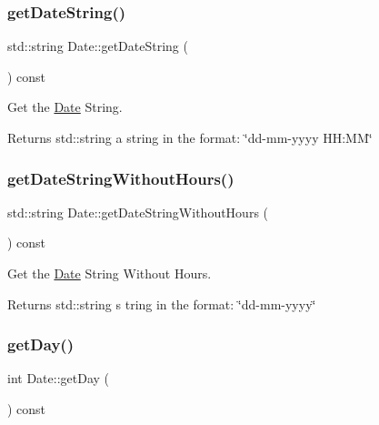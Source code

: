 \subsubsection{\texorpdfstring{get\+Date\+String()}{getDateString()}}
{\footnotesize\ttfamily std\+::string Date\+::get\+Date\+String (\begin{DoxyParamCaption}{ }\end{DoxyParamCaption}) const}



Get the \mbox{\hyperlink{classDate}{Date}} String. 

\begin{DoxyReturn}{Returns}
std\+::string a string in the format\+: \char`\"{}dd-\/mm-\/yyyy H\+H\+:\+M\+M\char`\"{} 
\end{DoxyReturn}
\mbox{\label{classDate_a54b53336c8ba897fae4d2bbb0aa84a99}} 
\subsubsection{\texorpdfstring{get\+Date\+String\+Without\+Hours()}{getDateStringWithoutHours()}}
{\footnotesize\ttfamily std\+::string Date\+::get\+Date\+String\+Without\+Hours (\begin{DoxyParamCaption}{ }\end{DoxyParamCaption}) const}



Get the \mbox{\hyperlink{classDate}{Date}} String Without Hours. 

\begin{DoxyReturn}{Returns}
std\+::string s tring in the format\+: \char`\"{}dd-\/mm-\/yyyy\char`\"{} 
\end{DoxyReturn}
\mbox{\label{classDate_a0f253815240e70f4c39cb93cc68bd3f4}} 
\subsubsection{\texorpdfstring{get\+Day()}{getDay()}}
{\footnotesize\ttfamily int Date\+::get\+Day (\begin{DoxyParamCaption}{ }\end{DoxyParamCaption}) const}



